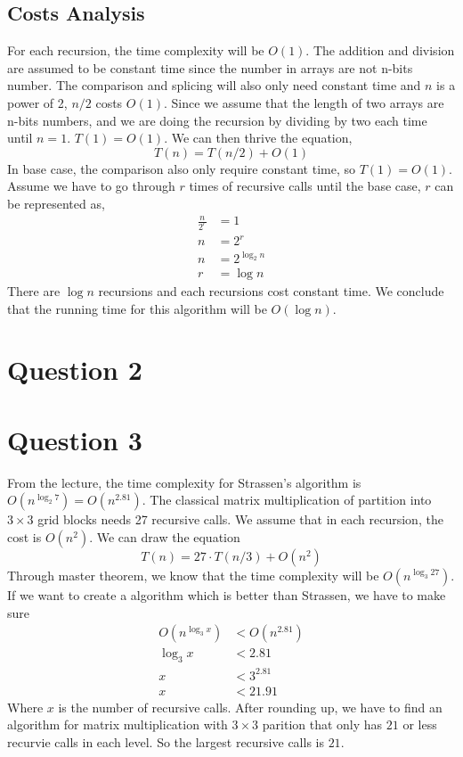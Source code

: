 \documentclass{article}
\begin{document}
    \subsection*{Costs Analysis}
    For each recursion, the time complexity will be $O(1)$. The addition and division are assumed to be constant time since the number in arrays are not n-bits number. The comparison and splicing
    will also only need constant time and $n$ is a power of 2, $n/2$ costs $O(1)$. Since we assume that the length of two arrays are n-bits numbers, and we are doing the recursion by dividing by two each time until $n=1$.
    $T(1) = O(1)$. We can then thrive the equation,
    $$T(n) = T(n/2) + O(1)$$
    In base case, the comparison also only require constant time, so $T(1) = O(1)$. Assume we have to go through $r$ times of recursive calls until the base case, $r$ can 
    be represented as,
    \begin{align}
        \frac{n}{2^r} &= 1 \nonumber \\
        n &= 2^r  \nonumber \\
        n &= 2^{\log_2 n} \nonumber \\
        r &= \log n \nonumber
    \end{align}
    There are $\log n$ recursions and each recursions cost constant time. We conclude that the running time for this algorithm will be $O(\log n)$.
    
\section*{Question 2}







\section*{Question 3}
From the lecture, the time complexity for Strassen's algorithm is $O(n^{\log_2 7}) = O(n^{2.81})$. The classical matrix multiplication of partition into $3 \times 3$
grid blocks needs 27 recursive calls. We assume that in each recursion, the cost is $O(n^2)$. We can draw the equation 
$$T(n) = 27 \cdot T(n/3) + O(n^2)$$
Through master theorem, we know that the time complexity will be $O(n^{\log_3 27})$. If we want to create a algorithm which is better than Strassen, we have 
to make sure 
\begin{align}
    O(n^{\log_3 x}) &< O(n^{2.81}) \nonumber \\
    \log_3 x &< 2.81 \nonumber \\
    x &< 3^{2.81} \nonumber\\
    x &< 21.91 \nonumber
\end{align}
Where $x$ is the number of recursive calls. After rounding up, we have to find an algorithm for matrix multiplication with $3\times 3$ parition that only has
$21$ or less recurvie calls in each level. So the largest recursive calls is $21$.
\end{document}
